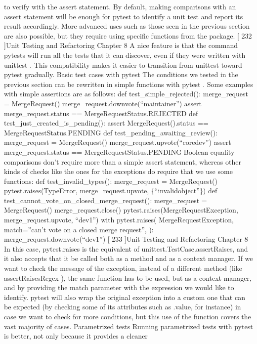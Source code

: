 \documentclass[a4paper,10pt,english]{sphinxmanual}
\begin{document}
to verify with the assert statement.
By default, making comparisons with an assert statement will be enough for pytest to
identify a unit test and report its result accordingly. More advanced uses such as those seen
in the previous section are also possible, but they require using specific functions from the
package.
{[} 232 {]}Unit Testing and Refactoring
Chapter 8
A nice feature is that the command pytests will run all the tests that it can discover, even
if they were written with unittest . This compatibility makes it easier to transition
from unittest toward pytest gradually.
Basic test cases with pytest
The conditions we tested in the previous section can be rewritten in simple functions with
pytest .
Some examples with simple assertions are as follows:
def test\_simple\_rejected():
merge\_request = MergeRequest()
merge\_request.downvote(“maintainer”)
assert merge\_request.status == MergeRequestStatus.REJECTED
def test\_just\_created\_is\_pending():
assert MergeRequest().status == MergeRequestStatus.PENDING
def test\_pending\_awaiting\_review():
merge\_request = MergeRequest()
merge\_request.upvote(“core\sphinxhyphen{}dev”)
assert merge\_request.status == MergeRequestStatus.PENDING
Boolean equality comparisons don’t require more than a simple assert statement, whereas
other kinds of checks like the ones for the exceptions do require that we use some functions:
def test\_invalid\_types():
merge\_request = MergeRequest()
pytest.raises(TypeError, merge\_request.upvote, \{“invalid\sphinxhyphen{}object”\})
def test\_cannot\_vote\_on\_closed\_merge\_request():
merge\_request = MergeRequest()
merge\_request.close()
pytest.raises(MergeRequestException, merge\_request.upvote, “dev1”)
with pytest.raises(
MergeRequestException,
match=”can’t vote on a closed merge request”,
):
merge\_request.downvote(“dev1”)
{[} 233 {]}Unit Testing and Refactoring
Chapter 8
In this case, pytest.raises is the equivalent of unittest.TestCase.assertRaises,
and it also accepts that it be called both as a method and as a context manager. If we want
to check the message of the exception, instead of a different method
(like assertRaisesRegex ), the same function has to be used, but as a context manager,
and by providing the match parameter with the expression we would like to identify.
pytest will also wrap the original exception into a custom one that can be expected (by
checking some of its attributes such as .value, for instance) in case we want to check for
more conditions, but this use of the function covers the vast majority of cases.
Parametrized tests
Running parametrized tests with pytest is better, not only because it provides a cleaner
\end{document}
